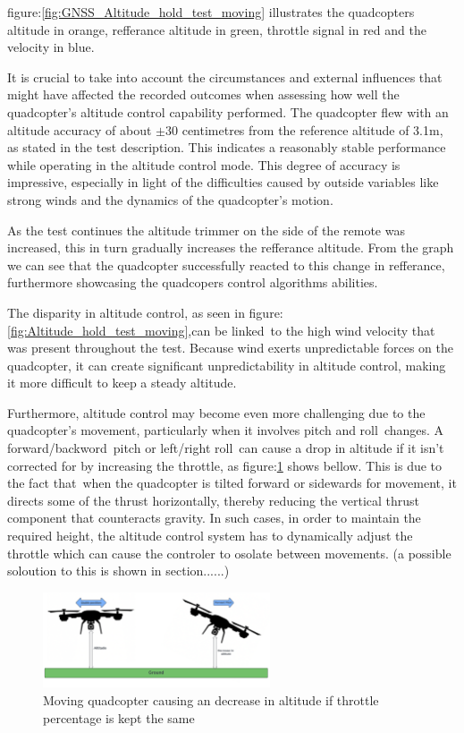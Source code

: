 \documentclass{article}
\begin{document}
figure:\ref{fig:GNSS_Altitude_hold_test_moving} illustrates the quadcopters
altitude in orange, refferance altitude in green, throttle signal in red and the
velocity in blue.

It is crucial to take into account the circumstances and external influences
that might have affected the recorded outcomes when assessing how well the
quadcopter's altitude control capability performed. The quadcopter flew with an
altitude accuracy of about \(\pm30\) centimetres from the reference altitude of
3.1m, as stated in the test description. This indicates a reasonably stable
performance while operating in the altitude control mode. This degree of
accuracy is impressive, especially in light of the difficulties caused by
outside variables like strong winds and the dynamics of the quadcopter's motion.

As the test continues the altitude trimmer on the side of the remote was
increased, this in turn gradually increases the refferance altitude. From the
graph we can see that the quadcopter successfully reacted to this change in
refferance, furthermore showcasing the quadcopers control algorithms abilities.

The disparity in altitude control, as seen in
figure:\ref{fig:Altitude_hold_test_moving},can be linked to the high wind
velocity that was present throughout the test. Because wind exerts unpredictable
forces on the quadcopter, it can create significant unpredictability in altitude
control, making it more difficult to keep a steady altitude.

Furthermore, altitude control may become even more challenging due to the
quadcopter's movement, particularly when it involves pitch and roll changes. A
forward/backword pitch or left/right roll can cause a drop in altitude if it
isn't corrected for by increasing the throttle, as
figure:\ref{fig:ToF_altitude_error} shows bellow. This is due to the fact
that when the quadcopter is tilted forward or sidewards for movement, it directs
some of the thrust horizontally, thereby reducing the vertical thrust component
that counteracts gravity. In such cases, in order to maintain the required
height, the altitude control system has to dynamically adjust the throttle which
can cause the controler to osolate between movements. (a possible soloution to
this is shown in section......)

\begin{figure}[H]
  \centering
  \includegraphics[width=0.6\textwidth]{Pictures/ToF_altitude_error.png}
  \caption{Moving quadcopter causing an decrease in altitude if throttle percentage is kept the same}
  \label{fig:ToF_altitude_error}
\end{figure}
\end{document}
